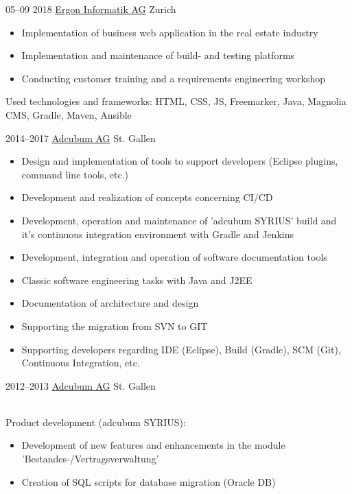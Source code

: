 \documentclass[]{cv-style}
\begin{document}
\begin{entrylist}
\entry
  {05--09 2018}
  {\href{https://www.ergon.ch}{Ergon Informatik AG}}
  {Zurich}
  {
  \begin{itemize}
  	\item Implementation of business web application in the real estate industry
  	\item Implementation and maintenance of build- and testing platforms
  	\item Conducting customer training and a requirements engineering workshop
  \end{itemize}
  Used technologies and frameworks: HTML, CSS, JS, Freemarker, Java, Magnolia CMS, Gradle, Maven, Ansible}
\entry
  {2014--2017}
  {\href{https://www.adcubum.com}{Adcubum AG}}
  {St. Gallen}
  {
  \begin{itemize}
    \item Design and implementation of tools to support developers (Eclipse plugins, command line tools, etc.)
    \item Development and realization of concepts concerning CI/CD
    \item Development, operation and maintenance of 'adcubum SYRIUS' build and it's continuous integration environment with Gradle and Jenkins
    \item Development, integration and operation of software documentation tools
    \item Classic software engineering tasks with Java and J2EE
    \item Documentation of architecture and design
    \item Supporting the migration from SVN to GIT
    \item Supporting developers regarding IDE (Eclipse), Build (Gradle), SCM (Git), Continuous Integration, etc.
  \end{itemize}}
\entry
  {2012--2013}
  {\href{https://www.adcubum.com}{Adcubum AG}}
  {St. Gallen}
  {\\
  Product development (adcubum SYRIUS):
  \begin{itemize}
    \item Development of new features and enhancements in the module 'Bestandes-/Vertragsverwaltung'
    \item Creation of SQL scripts for database migration (Oracle DB)

\end{itemize}}
\end{entrylist}
\end{document}
